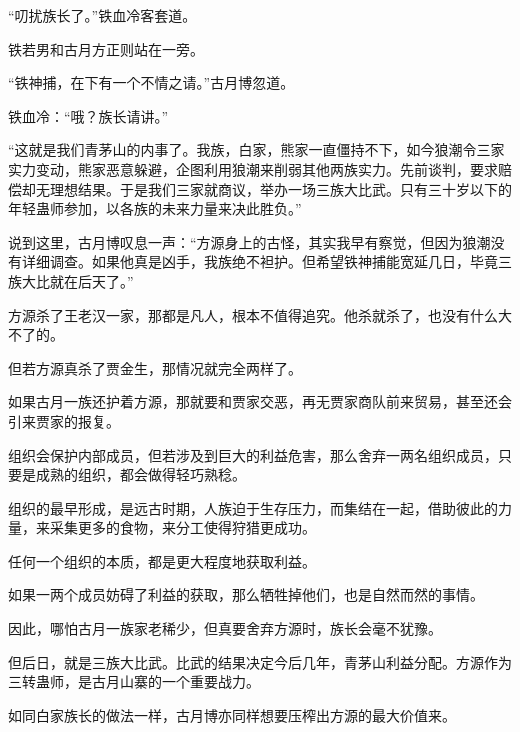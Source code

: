 \begin{this_body}
“叨扰族长了。”铁血冷客套道。

铁若男和古月方正则站在一旁。

“铁神捕，在下有一个不情之请。”古月博忽道。

铁血冷：“哦？族长请讲。”

“这就是我们青茅山的内事了。我族，白家，熊家一直僵持不下，如今狼潮令三家实力变动，熊家恶意躲避，企图利用狼潮来削弱其他两族实力。先前谈判，要求赔偿却无理想结果。于是我们三家就商议，举办一场三族大比武。只有三十岁以下的年轻蛊师参加，以各族的未来力量来决此胜负。”

说到这里，古月博叹息一声：“方源身上的古怪，其实我早有察觉，但因为狼潮没有详细调查。如果他真是凶手，我族绝不袒护。但希望铁神捕能宽延几日，毕竟三族大比就在后天了。”

方源杀了王老汉一家，那都是凡人，根本不值得追究。他杀就杀了，也没有什么大不了的。

但若方源真杀了贾金生，那情况就完全两样了。

如果古月一族还护着方源，那就要和贾家交恶，再无贾家商队前来贸易，甚至还会引来贾家的报复。

组织会保护内部成员，但若涉及到巨大的利益危害，那么舍弃一两名组织成员，只要是成熟的组织，都会做得轻巧熟稔。

组织的最早形成，是远古时期，人族迫于生存压力，而集结在一起，借助彼此的力量，来采集更多的食物，来分工使得狩猎更成功。

任何一个组织的本质，都是更大程度地获取利益。

如果一两个成员妨碍了利益的获取，那么牺牲掉他们，也是自然而然的事情。

因此，哪怕古月一族家老稀少，但真要舍弃方源时，族长会毫不犹豫。

但后日，就是三族大比武。比武的结果决定今后几年，青茅山利益分配。方源作为三转蛊师，是古月山寨的一个重要战力。

如同白家族长的做法一样，古月博亦同样想要压榨出方源的最大价值来。

\end{this_body}

